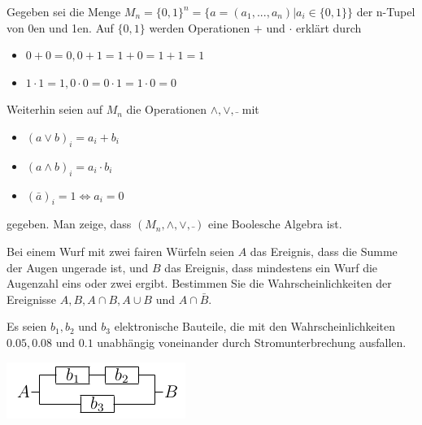 \documentclass[10pt, a4paper]{exam}
\begin{document}
\begin{questions}
    \question Gegeben sei die Menge $M_n=\{0,1\}^n =\{a=(a_1,...,a_n)|a_i\in\{0,1\}\}$ der n-Tupel von 0en und 1en. Auf $\{0,1\}$ werden Operationen $+$ und $\cdot$ erklärt durch
    \begin{itemize}
        \item $0 + 0 = 0, 0 + 1 = 1 + 0 = 1 + 1 = 1$
        \item $1 \cdot 1 = 1, 0 \cdot 0 = 0 \cdot 1 = 1 \cdot 0 = 0$
    \end{itemize}
    Weiterhin seien auf $M_n$ die Operationen $\wedge, \vee, \bar{}$ mit
    \begin{itemize}
        \item $(a\vee b)_i = a_i + b_i$
        \item $(a\wedge b)_i = a_i \cdot b_i$
        \item $(\bar{a})_i = 1 \Leftrightarrow a_i = 0$
    \end{itemize}
    gegeben. Man zeige, dass $(M_n,\wedge,\vee,\bar{})$ eine Boolesche Algebra ist.

    \question Bei einem Wurf mit zwei fairen Würfeln seien $A$ das Ereignis, dass die Summe der Augen ungerade ist, und $B$ das Ereignis, dass mindestens ein Wurf die Augenzahl eins oder zwei ergibt. Bestimmen Sie die Wahrscheinlichkeiten der Ereignisse $A, B, A\cap B, A\cup B$ und $A\cap\bar{B}$.

    \question Es seien $b_1,b_2$ und $b_3$ elektronische Bauteile, die mit den Wahrscheinlichkeiten $0.05, 0.08$ und $0.1$ unabhängig voneinander durch Stromunterbrechung ausfallen.

    \begin{center}\includegraphics[width=.2\linewidth]{Assets/GudS-schaltung.png}\end{center}


\end{questions}
\end{document}
